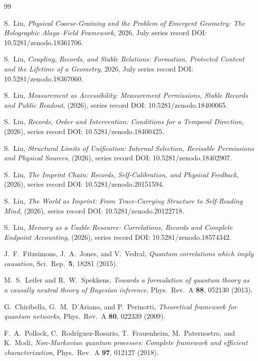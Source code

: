 \documentclass[11pt,a4paper]{article}
\begin{document}
\begin{thebibliography}{99}

S.~Liu, \emph{Physical Coarse-Graining and the Problem of Emergent Geometry: The Holographic
Alaya--Field Framework}, 2026, July series
record DOI: 10.5281/zenodo.18361706.

S.~Liu, \emph{Coupling, Records, and Stable Relations:
Formation, Protected Content and the Lifetime of a Geometry},
2026, July series record DOI:
10.5281/zenodo.18367060.

S.~Liu, \emph{Measurement as Accessibility: Measurement Permissions, Stable Records and Public Readout}, (2026), series record DOI: 10.5281/zenodo.18400065.

S.~Liu, \emph{Records, Order and Intervention: Conditions for a Temporal Direction}, (2026), series record DOI: 10.5281/zenodo.18400425.

S.~Liu, \emph{Structural Limits of Unification: Internal Selection, Revisable Permissions and Physical Sources}, (2026), series record DOI: 10.5281/zenodo.18402907.

S.~Liu, \emph{The Imprint Chain: Records, Self-Calibration, and Physical Feedback}, (2026), series record DOI: 10.5281/zenodo.20151594.

S.~Liu, \emph{The World as Imprint: From Trace-Carrying Structure to Self-Reading Mind}, (2026), series record DOI: 10.5281/zenodo.20122718.

S.~Liu, \emph{Memory as a Usable Resource: Correlations, Records and Complete Endpoint Accounting}, (2026), series record DOI: 10.5281/zenodo.18574342.

J.~F.~Fitzsimons, J.~A.~Jones, and V.~Vedral, \emph{Quantum correlations which imply causation}, Sci.\ Rep.\ \textbf{5}, 18281 (2015).

M.~S.~Leifer and R.~W.~Spekkens, \emph{Towards a formulation of quantum theory as a causally neutral theory of Bayesian inference}, Phys.\ Rev.\ A \textbf{88}, 052130 (2013).

G.~Chiribella, G.~M.~D'Ariano, and P.~Perinotti, \emph{Theoretical framework for quantum networks}, Phys.\ Rev.\ A \textbf{80}, 022339 (2009).

F.~A.~Pollock, C.~Rodr\'iguez-Rosario, T.~Frauenheim, M.~Paternostro, and K.~Modi, \emph{Non-Markovian quantum processes: Complete framework and efficient characterization}, Phys.\ Rev.\ A \textbf{97}, 012127 (2018).


\end{thebibliography}
\end{document}
